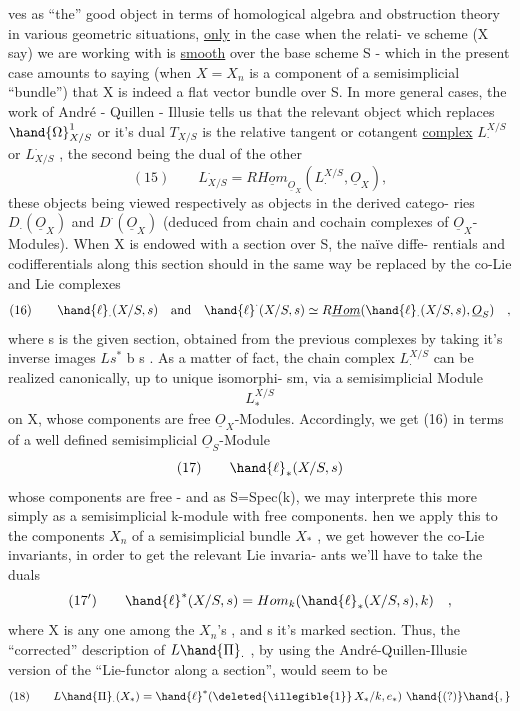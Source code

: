 
ves as ``the'' good object in terms of homological algebra and obstruction
theory in various geometric situations, \uline{only} in the case when the relati-%
ve scheme (X say) we are working with is \uline{smooth} over the base scheme S
- which in the present case amounts to saying (when $X=X_n$ is a component
of a semisimplicial ``bundle'') that X  is indeed a flat vector bundle
over S. In more general cases, the work of André - Quillen - Illusie
tells us that the relevant object which replaces $\hand{\Omega}^1_{X/S}$ or it's dual $T_{X/S}$
is the relative tangent or cotangent \uline{complex} $L_\cdot^{X/S}$ or $L^\cdot_{X/S}$ , the second
being the dual of the other
\[ (15) \qquad L^\cdot_{X/S} = R\underline{Hom}_{\underline{O}_X}(L_\cdot^{X/S} , \underline{O}_X) , \]
these objects being viewed respectively as objects in the derived catego-%
ries $D_\cdot(\underline{O}_X)$ and $D^\cdot(\underline{O}_X)$ (deduced from chain and cochain complexes of
$\underline{O}_X$-Modules). When X is endowed with a section over S, the naïve diffe-%
rentials and codifferentials along this section should in the same way
be replaced by the co-Lie and Lie complexes
\[ (16) \qquad \hand{\ell}_\cdot(X/S,s) \quad\text{and}\quad \hand{\ell}^\cdot(X/S,s) \simeq R\underline{Hom}(\hand{\ell}_\cdot(X/S,s), \underline{O}_S) \quad , \]
where s is the given section, obtained from the previous complexes
by taking it's inverse images $Ls^*$ b s . As a matter of fact, the
chain complex $L_\cdot^{X/S}$ can be realized canonically, up to unique isomorphi-%
sm, via a semisimplicial Module
\[ L_*^{X/S} \]
on X, whose components are free $\underline{O}_X$-Modules. Accordingly, we get
(16) in terms of a well defined semisimplicial $\underline{O}_S$-Module 
\[ (17) \qquad \hand{\ell}_*(X/S,s) \]
whose components are free - and as S=Spec(k), we may interprete this
more simply as a semisimplicial k-module with free components. hen we
apply this to the components $X_n$ of a semisimplicial bundle $X_*$ , we get
however the co-Lie invariants, in order to get the relevant Lie invaria-%
ants we'll have to take the duals
\[ (17') \qquad \hand{\ell}^*(X/S,s) = Hom_k(\hand{\ell}_*(X/S,s),k) \quad , \]
where X is any one among the $X_n$'s , and s it's marked section. Thus,
the ``corrected'' description of $L\hand{\Pi}_\cdot$ , by using the André-Quillen-Illusie
version of the ``Lie\hand{\unsure{$^*$}}-functor along a section'', would seem to be
\[ (18) \qquad L\hand{\Pi}_\cdot(X_*) = \hand{\ell}^*(\deleted{\illegible{1}}\, X_*/k , e_*) \ \hand{(?)}\hand{,} \]

